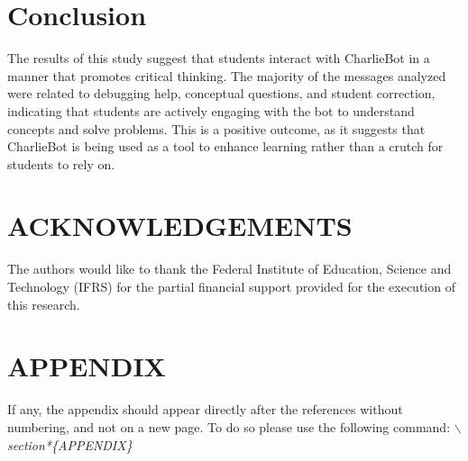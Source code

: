 \documentclass[a4paper,twoside]{article}
\begin{document}
\section{Conclusion}

The results of this study suggest that students interact with CharlieBot in a
manner that promotes critical thinking. The majority of the messages analyzed
were related to debugging help, conceptual questions, and student correction,
indicating that students are actively engaging with the bot to understand
concepts and solve problems. This is a positive outcome, as it suggests that
CharlieBot is being used as a tool to enhance learning rather than a crutch for
students to rely on.

\section*{ACKNOWLEDGEMENTS}

The authors would like to thank the Federal Institute of Education, Science and
Technology (IFRS) for the partial financial support provided for the execution
of this research.


{\small
}

\section*{\uppercase{Appendix}}

If any, the appendix should appear directly after the
references without numbering, and not on a new page. To do so please use the
following command: \textit{$\backslash$section*\{APPENDIX\}}
\end{document}
